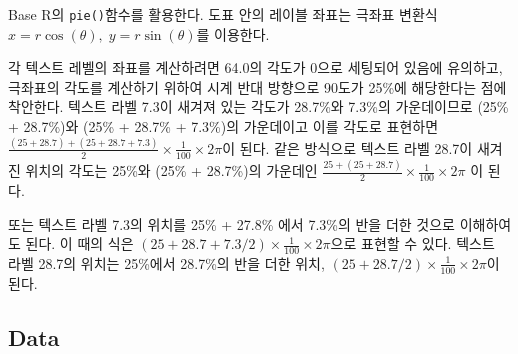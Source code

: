 \documentclass[
]{article}
\begin{document}
Base R의 \texttt{pie()}함수를 활용한다. 도표 안의 레이블 좌표는 극좌표
변환식 \(x = r \cos(\theta),\; y = r \sin(\theta)\)를 이용한다.

각 텍스트 레벨의 좌표를 계산하려면 64.0의 각도가 0으로 세팅되어 있음에
유의하고, 극좌표의 각도를 계산하기 위하여 시계 반대 방향으로 90도가
25\%에 해당한다는 점에 착안한다. 텍스트 라벨 7.3이 새겨져 있는 각도가
28.7\%와 7.3\%의 가운데이므로 (25\% + 28.7\%)와 (25\% + 28.7\% +
7.3\%)의 가운데이고 이를 각도로 표현하면
\(\frac{(25 + 28.7) + (25 + 28.7 + 7.3)}{2}\times\frac{1}{100}\times2\pi\)이
된다. 같은 방식으로 텍스트 라벨 28.7이 새겨진 위치의 각도는 25\%와 (25\%
+ 28.7\%)의 가운데인
\(\frac{25 + (25 + 28.7)}{2}\times\frac{1}{100}\times2\pi\) 이 된다.

또는 텍스트 라벨 7.3의 위치를 25\% + 27.8\% 에서 7.3\%의 반을 더한
것으로 이해하여도 된다. 이 때의 식은
\((25 + 28.7 + 7.3/2)\times\frac{1}{100}\times2\pi\)으로 표현할 수 있다.
텍스트 라벨 28.7의 위치는 25\%에서 28.7\%의 반을 더한 위치,
\((25 + 28.7/2)\times\frac{1}{100}\times2\pi\)이 된다.

\hypertarget{data}{%
\subsection{Data}\label{data}}
\end{document}
